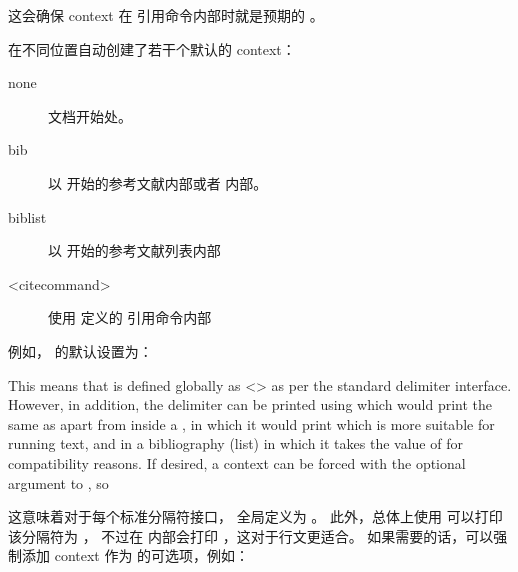 \begin{ltxsyntax}
\begin{ltxexample}[style=latex]
\end{ltxexample}
%
这会确保 context 在  引用命令内部时就是预期的 。

\end{ltxsyntax}
%
\biblatex 在不同位置自动创建了若干个默认的 context：

\begin{description}
	\item[none] %
	文档开始处。
	\item[bib] %
	以  开始的参考文献内部或者  内部。
	\item[biblist] %
	以  开始的参考文献列表内部
	\item[<citecommand>] %
	使用  定义的  引用命令内部
\end{description}

例如， 的默认设置为：

\begin{ltxexample}[style=latex]{}
\end{ltxexample}
%
This means that  is defined globally as <> as per the standard delimiter interface. However, in addition, the delimiter can be printed using  which would print the same as  apart from inside a , in which it would print  which is more suitable for running text, and in a bibliography (list) in which it takes the value of  for compatibility reasons. If desired, a context can be forced with the optional argument to , so

这意味着对于每个标准分隔符接口， 全局定义为 。
此外，总体上使用  可以打印该分隔符为 ，
不过在  内部会打印 ，这对于行文更适合。
如果需要的话，可以强制添加 context 作为 的可选项，例如：

